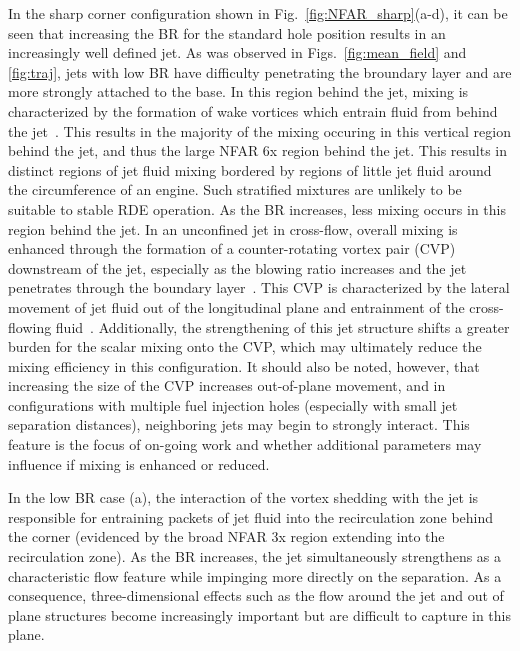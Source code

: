 \documentclass[10pt, twocolumn]{article}
\begin{document}
In the sharp corner configuration shown in Fig.~\ref{fig:NFAR_sharp}(a-d), it can be seen that increasing the BR for the standard hole position results in an increasingly well defined jet. As was observed in Figs.~\ref{fig:mean_field} and \ref{fig:traj}, jets with low BR have difficulty penetrating the broundary layer and are more strongly attached to the base. In this region behind the jet, mixing is characterized by the formation of wake vortices which entrain fluid from behind the jet~\cite{Fric1994}. This results in the majority of the mixing occuring in this vertical region behind the jet, and thus the large NFAR 6x region behind the jet. This results in distinct regions of jet fluid mixing bordered by regions of little jet fluid around the circumference of an engine. Such stratified mixtures are unlikely to be suitable to stable RDE operation. As the BR increases, less mixing occurs in this region behind the jet. In an unconfined jet in cross-flow, overall mixing is enhanced through the formation of a counter-rotating vortex pair (CVP) downstream of the jet, especially as the blowing ratio increases and the jet penetrates through the boundary layer~\cite{Kamotani1972,Fric1994,Megerian2007}. This CVP is characterized by the lateral movement of jet fluid out of the longitudinal plane and entrainment of the cross-flowing fluid~\cite{Salewski2008}. Additionally, the strengthening of this jet structure shifts a greater burden for the scalar mixing onto the CVP, which may ultimately reduce the mixing efficiency in this configuration. It should also be noted, however, that increasing the size of the CVP increases out-of-plane movement, and in configurations with multiple fuel injection holes (especially with small jet separation distances), neighboring jets may begin to strongly interact. This feature is the focus of on-going work and whether additional parameters may influence if mixing is enhanced or reduced. 

In the low BR case (a), the interaction of the vortex shedding with the jet is responsible for entraining packets of jet fluid into the recirculation zone behind the corner (evidenced by the broad NFAR 3x region extending into the recirculation zone). As the BR increases, the jet simultaneously strengthens as a characteristic flow feature while impinging more directly on the separation. As a consequence, three-dimensional effects such as the flow around the jet and out of plane structures become increasingly important but are difficult to capture in this plane.
\end{document}
